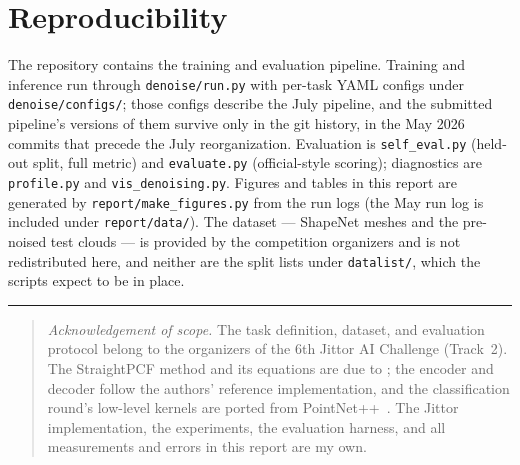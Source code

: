 \documentclass{article}
\begin{document}
\section{Reproducibility}
\label{sec:repro}

The repository contains the training and evaluation pipeline. Training and inference run through \texttt{denoise/run.py} with per-task YAML configs under \texttt{denoise/configs/}; those configs describe the July pipeline, and the submitted pipeline's versions of them survive only in the git history, in the May 2026 commits that precede the July reorganization. Evaluation is \texttt{self\_eval.py} (held-out split, full metric) and \texttt{evaluate.py} (official-style scoring); diagnostics are \texttt{profile.py} and \texttt{vis\_denoising.py}. Figures and tables in this report are generated by \texttt{report/make\_figures.py} from the run logs (the May run log is included under \texttt{report/data/}). The dataset --- ShapeNet meshes and the pre-noised test clouds --- is provided by the competition organizers and is not redistributed here, and neither are the split lists under \texttt{datalist/}, which the scripts expect to be in place.

\vspace{0.8em}
\noindent\rule{\linewidth}{0.4pt}
\vspace{-0.4em}
\begin{quote}
\small \emph{Acknowledgement of scope.} The task definition, dataset, and evaluation protocol belong to the organizers of the 6th Jittor AI Challenge (Track~2). The StraightPCF method and its equations are due to \citet{straightpcf}; the encoder and decoder follow the authors' reference implementation, and the classification round's low-level kernels are ported from PointNet++~\citep{pointnet}. The Jittor implementation, the experiments, the evaluation harness, and all measurements and errors in this report are my own.
\end{quote}
\end{document}
